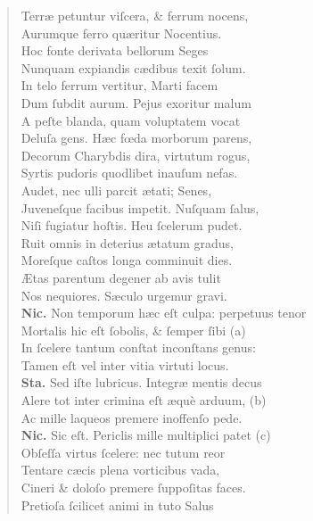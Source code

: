 \documentclass[a4paper,12pt]{article}
\begin{document}
\begin{verse}
Terræ petuntur viſcera, \& ferrum nocens,\\[0pt]
Aurumque ferro quæritur Nocentius.\\[0pt]
Hoc fonte derivata bellorum Seges\\[0pt]
Nunquam expiandis cædibus texit ſolum.\\[0pt]
In telo ferrum vertitur, Marti facem\\[0pt]
Dum ſubdit aurum. Pejus exoritur malum\\[0pt]
A peſte blanda, quam voluptatem vocat\\[0pt]
Deluſa gens. Hæc fœda morborum parens,\\[0pt]
Decorum Charybdis dira, virtutum rogus,\\[0pt]
Syrtis pudoris quodlibet inauſum nefas.\\[0pt]
Audet, nec ulli parcit ætati; Senes,\\[0pt]
Juveneſque facibus impetit. Nuſquam ſalus,\\[0pt]
Niſi fugiatur hoſtis. Heu ſcelerum pudet.\\[0pt]
Ruit omnis in deterius ætatum gradus,\\[0pt]
Moreſque caſtos longa comminuit dies.\\[0pt]
Ætas parentum degener ab avis tulit\\[0pt]
Nos nequiores. Sæculo urgemur gravi.\\[0pt]
\textbf{Nic.} Non temporum hæc eſt culpa: perpetuus tenor\\[0pt]
Mortalis hic eſt ſobolis, \& ſemper ſibi (a)\footnotemark\\[0pt]
In ſcelere tantum conſtat inconſtans genus:\\[0pt]
Tamen eſt vel inter vitia virtuti locus.\\[0pt]
\textbf{Sta.} Sed iſte lubricus. Integræ mentis decus\\[0pt]
Alere tot inter crimina eſt æquè arduum, (b)\footnotemark\\[0pt]
Ac mille laqueos premere inoffenſo pede.\\[0pt]
\textbf{Nic.} Sic eſt. Periclis mille multiplici patet (c)\footnotemark\\[0pt]
Obſeſſa virtus ſcelere: nec tutum reor\\[0pt]
Tentare cæcis plena vorticibus vada,\\[0pt]
Cineri \& doloſo premere ſuppoſitas faces.\\[0pt]
Pretioſa ſcilicet animi in tuto Salus\\[0pt]

\end{verse}
\end{document}
